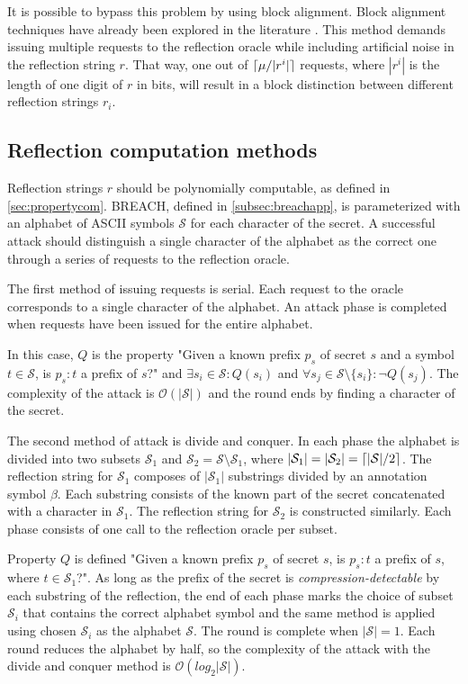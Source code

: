 \documentclass{sig-alternate-05-2015}
\DeclarePairedDelimiter{\ceil}{\lceil}{\rceil}
\begin{document}
It is possible to bypass this problem by using block alignment. Block alignment
techniques have already been explored in the literature \cite{c14}.  This method
demands issuing multiple requests to the reflection oracle while including
artificial noise in the reflection string $r$.  That way, one out of
$\ceil{\mu / |r^i|}$ requests, where $|r^i|$ is the length of one digit of
$r$ in bits, will result in a block distinction between different reflection
strings $r_i$.

\subsection{Reflection computation methods}\label{subsec:reflectionmethods}
Reflection strings $r$ should be polynomially computable, as defined in
\ref{sec:propertycom}. BREACH, defined in \ref{subsec:breachapp}, is
parameterized with an alphabet of ASCII symbols $\mathcal{S}$ for each character of the
secret. A successful attack should distinguish a single character of the
alphabet as the correct one through a series of requests to the reflection
oracle.

The first method of issuing requests is serial. Each request to the oracle
corresponds to a single character of the alphabet. An attack phase is completed
when requests have been issued for the entire alphabet.

In this case, $Q$ is the property "Given a known prefix $p_s$ of secret $s$ and
a symbol $t \in \mathcal{S}$, is $p_s:t$ a prefix of $s$?" and $\exists
s_i \in \mathcal{S}: Q(s_i)$ and $\forall s_j \in \mathcal{S} \setminus \{s_i\}:
\lnot Q(s_j)$. The complexity of the attack is $\mathcal{O}(|\mathcal{S}|)$ and
the round ends by finding a character of the secret.

The second method of attack is divide and conquer. In each phase the alphabet is
divided into two subsets $\mathcal{S}_1$ and $\mathcal{S}_2 = \mathcal{S}
\setminus \mathcal{S}_1$, where $|\mathcal{S}_1| = |\mathcal{S}_2| =
\ceil{|\mathcal{S}| / 2}$. The reflection string for $\mathcal{S}_1$ composes of
$|\mathcal{S}_1|$ substrings divided by an annotation symbol $\beta$. Each
substring consists of the known part of the secret concatenated with a character
in $\mathcal{S}_1$. The reflection string for $\mathcal{S}_2$ is constructed
similarly. Each phase consists of one call to the reflection oracle per subset.

Property $Q$ is defined "Given a known prefix $p_s$ of secret $s$, is $p_s:t$ a
prefix of $s$, where $t \in \mathcal{S}_1$?". As long as the prefix of the
secret is \textit{compression-detectable} by each substring of the reflection,
the end of each phase marks the choice of subset $\mathcal{S}_i$ that contains
the correct alphabet symbol and the same method is applied using chosen
$\mathcal{S}_i$ as the alphabet $\mathcal{S}$. The round is complete when
$|\mathcal{S}| = 1$. Each round reduces the alphabet by half, so the complexity
of the attack with the divide and conquer method  is
$\mathcal{O}(log_2|\mathcal{S}|)$.
\end{document}

